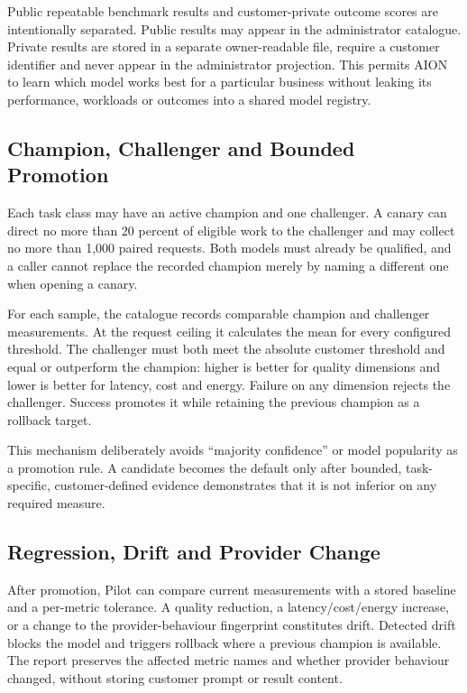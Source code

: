 Public repeatable benchmark results and customer-private outcome scores are intentionally
separated.  Public results may appear in the administrator catalogue.  Private results
are stored in a separate owner-readable file, require a customer identifier and never
appear in the administrator projection.  This permits AION to learn which model works
best for a particular business without leaking its performance, workloads or outcomes
into a shared model registry.

\subsection{Champion, Challenger and Bounded Promotion}

Each task class may have an active champion and one challenger.  A canary can direct no
more than 20 percent of eligible work to the challenger and may collect no more than
1,000 paired requests.  Both models must already be qualified, and a caller cannot replace
the recorded champion merely by naming a different one when opening a canary.

For each sample, the catalogue records comparable champion and challenger measurements.
At the request ceiling it calculates the mean for every configured threshold.  The
challenger must both meet the absolute customer threshold and equal or outperform the
champion: higher is better for quality dimensions and lower is better for latency, cost
and energy.  Failure on any dimension rejects the challenger.  Success promotes it while
retaining the previous champion as a rollback target.

This mechanism deliberately avoids ``majority confidence'' or model popularity as a
promotion rule.  A candidate becomes the default only after bounded, task-specific,
customer-defined evidence demonstrates that it is not inferior on any required measure.

\subsection{Regression, Drift and Provider Change}

After promotion, Pilot can compare current measurements with a stored baseline and a
per-metric tolerance.  A quality reduction, a latency/cost/energy increase, or a change
to the provider-behaviour fingerprint constitutes drift.  Detected drift blocks the model
and triggers rollback where a previous champion is available.  The report preserves the
affected metric names and whether provider behaviour changed, without storing customer
prompt or result content.

